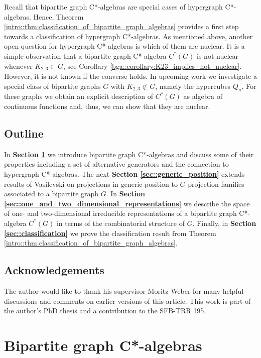 \documentclass[a4paper]{amsart}
\begin{document}
Recall that bipartite graph C*-algebras are special cases of hypergraph C*-algebras. Hence, Theorem \ref{intro::thm:classification_of_bipartite_graph_algebras} provides a first step towards a classification of hypergraph C*-algebras. As mentioned above, another open question for hypergraph C*-algebras is which of them are nuclear. It is a simple observation that a bipartite graph C*-algebra $C^\ast(G)$ is not nuclear whenever $K_{2,3} \subset G$, see Corollary \ref{bga::corollary:K23_implies_not_nuclear}. However, it is not known if the converse holds. In upcoming work we investigate a special class of bipartite graphs $G$ with $K_{2,3} \not \subset G$, namely the hypercubes $Q_n$. For these graphs we obtain an explicit description of $C^\ast(G)$ as algebra of continuous functions and, thus, we can show that they are nuclear.

\subsection{Outline}

In \textbf{Section \ref{sec::bipartite_graph_algebras}} we introduce bipartite graph C*-algebras and discuss some of their properties including a set of alternative generators and the connection to hypergraph C*-algebras. The next \textbf{Section \ref{sec::generic_position}} extends results of Vasilevski \cite{vasilevski_c-algebras_1998} on projections in generic position to $G$-projection families associated to a bipartite graph $G$. In \textbf{Section \ref{sec::one_and_two_dimensional_representations}} we describe the space of one- and two-dimensional irreducible representations of a bipartite graph C*-algebra $C^\ast(G)$ in terms of the combinatorial structure of $G$. Finally, in \textbf{Section \ref{sec::classification}} we prove the classification result from Theorem \ref{intro::thm:classification_of_bipartite_graph_algebras}.

\subsection{Acknowledgements}

The author would like to thank his supervisor Moritz Weber for many helpful discussions and comments on earlier versions of this article. This work is part of the author's PhD thesis and a contribution to the SFB-TRR 195.

\section{Bipartite graph C*-algebras}
\label{sec::bipartite_graph_algebras}
\end{document}
